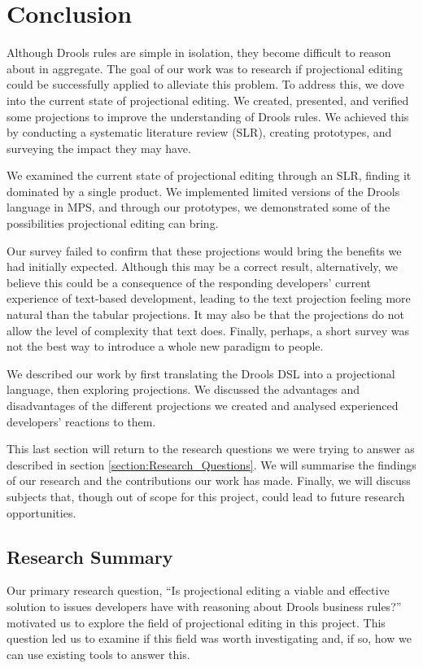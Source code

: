 \chapter{Conclusion}
\label{chapter:Conclusion}

Although Drools rules are simple in isolation, they become difficult to reason about in aggregate.
The goal of our work was to research if projectional editing could be successfully applied to alleviate this problem.
To address this, we dove into the current state of projectional editing.
We created, presented, and verified some projections to improve the understanding of Drools rules.
We achieved this by conducting a systematic literature review (SLR), creating prototypes, and surveying the impact they may have.

We examined the current state of projectional editing through an SLR, finding it dominated by a single product.
We implemented limited versions of the Drools language in MPS, and through our prototypes, we demonstrated some of the possibilities projectional editing can bring.

Our survey failed to confirm that these projections would bring the benefits we had initially expected.
Although this may be a correct result, alternatively, we believe this could be a consequence of the responding developers' current experience of text-based development, leading to the text projection feeling more natural than the tabular projections.
It may also be that the projections do not allow the level of complexity that text does.
Finally, perhaps, a short survey was not the best way to introduce a whole new paradigm to people.  

We described our work by first translating the Drools DSL into a projectional language, then exploring projections.
We discussed the advantages and disadvantages of the different projections we created and analysed experienced developers' reactions to them.

This last section will return to the research questions we were trying to answer as described in section \ref{section:Research_Questions}. 
We will summarise the findings of our research and the contributions our work has made.
Finally, we will discuss subjects that, though out of scope for this project, could lead to future research opportunities.

\section{Research Summary}
Our primary research question, ``Is projectional editing a viable and effective solution to issues developers have with reasoning about Drools business rules?'' motivated us to explore the field of projectional editing in this project.
This question led us to examine if this field was worth investigating and, if so, how we can use existing tools to answer this.

